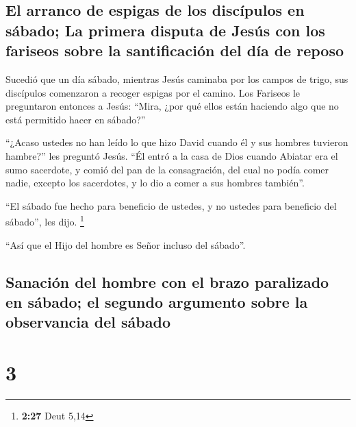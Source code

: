 \hypertarget{el-arranco-de-espigas-de-los-discuxedpulos-en-suxe1bado-la-primera-disputa-de-jesuxfas-con-los-fariseos-sobre-la-santificaciuxf3n-del-duxeda-de-reposo}{%
\subsection{El arranco de espigas de los discípulos en sábado; La
primera disputa de Jesús con los fariseos sobre la santificación del día
de
reposo}\label{el-arranco-de-espigas-de-los-discuxedpulos-en-suxe1bado-la-primera-disputa-de-jesuxfas-con-los-fariseos-sobre-la-santificaciuxf3n-del-duxeda-de-reposo}}

 Sucedió que un día sábado, mientras Jesús caminaba por
los campos de trigo, sus discípulos comenzaron a recoger espigas por el
camino.  Los Fariseos le preguntaron entonces a Jesús:
``Mira, ¿por qué ellos están haciendo algo que no está permitido hacer
en sábado?''

 ``¿Acaso ustedes no han leído lo que hizo David cuando
él y sus hombres tuvieron hambre?'' les preguntó Jesús. 
``Él entró a la casa de Dios cuando Abiatar era el sumo sacerdote, y
comió del pan de la consagración, del cual no podía comer nadie, excepto
los sacerdotes, y lo dio a comer a sus hombres también''.

 ``El sábado fue hecho para beneficio de ustedes, y no
ustedes para beneficio del sábado'', les dijo. \footnote{\textbf{2:27}
  Deut 5,14}

 ``Así que el Hijo del hombre es Señor incluso del
sábado''.

\hypertarget{sanaciuxf3n-del-hombre-con-el-brazo-paralizado-en-suxe1bado-el-segundo-argumento-sobre-la-observancia-del-suxe1bado}{%
\subsection{Sanación del hombre con el brazo paralizado en sábado; el
segundo argumento sobre la observancia del
sábado}\label{sanaciuxf3n-del-hombre-con-el-brazo-paralizado-en-suxe1bado-el-segundo-argumento-sobre-la-observancia-del-suxe1bado}}

\hypertarget{section-2}{%
\section{3}\label{section-2}}

